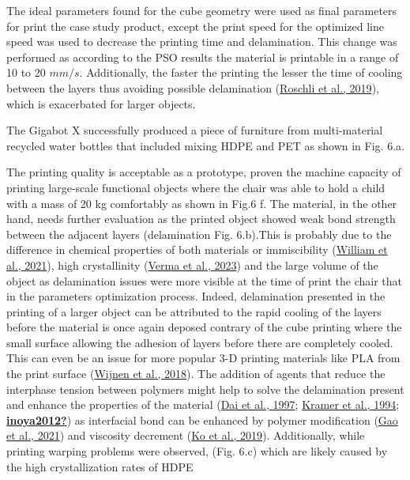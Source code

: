 \documentclass[
  12pt,
  number,
  review]{elsarticle}
\begin{document}
The ideal parameters found for the cube geometry were used as final
parameters for print the case study product, except the print speed for
the optimized line speed was used to decrease the printing time and
delamination. This change was performed as according to the PSO results
the material is printable in a range of 10 to 20 \(mm/s\). Additionally,
the faster the printing the lesser the time of cooling between the
layers thus avoiding possible delamination
(\protect\hyperlink{ref-roschli2019}{Roschli et al., 2019}), which is
exacerbated for larger objects.

The Gigabot X successfully produced a piece of furniture from
multi-material recycled water bottles that included mixing HDPE and PET
as shown in Fig. 6.a.

The printing quality is acceptable as a prototype, proven the machine
capacity of printing large-scale functional objects where the chair was
able to hold a child with a mass of 20 kg comfortably as shown in Fig.6
f. The material, in the other hand, needs further evaluation as the
printed object showed weak bond strength between the adjacent layers
(delamination Fig. 6.b).This is probably due to the difference in
chemical properties of both materials or immiscibility
(\protect\hyperlink{ref-william2021}{William et al., 2021}), high
crystallinity (\protect\hyperlink{ref-verma2023}{Verma et al., 2023})
and the large volume of the object as delamination issues were more
visible at the time of print the chair that in the parameters
optimization process. Indeed, delamination presented in the printing of
a larger object can be attributed to the rapid cooling of the layers
before the material is once again deposed contrary of the cube printing
where the small surface allowing the adhesion of layers before there are
completely cooled. This can even be an issue for more popular 3-D
printing materials like PLA from the print surface
(\protect\hyperlink{ref-wijnen2018}{Wijnen et al., 2018}). The addition
of agents that reduce the interphase tension between polymers might help
to solve the delamination present and enhance the properties of the
material (\protect\hyperlink{ref-dai1997}{Dai et al., 1997};
\protect\hyperlink{ref-kramer1994}{Kramer et al., 1994};
\protect\hyperlink{ref-inoya2012}{\textbf{inoya2012?}}) as interfacial
bond can be enhanced by polymer modification
(\protect\hyperlink{ref-gao2021}{Gao et al., 2021}) and viscosity
decrement (\protect\hyperlink{ref-ko2019}{Ko et al., 2019}).
Additionally, while printing warping problems were observed, (Fig. 6.c)
which are likely caused by the high crystallization rates of HDPE
\end{document}
